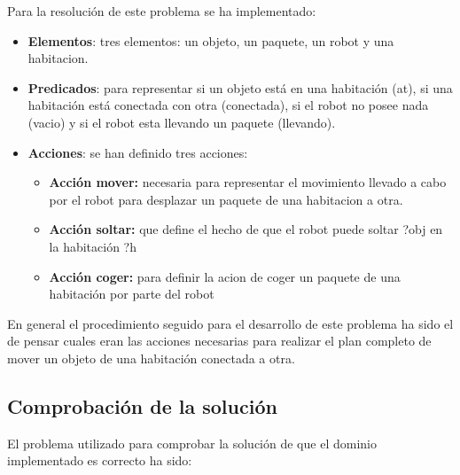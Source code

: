 Para la resolución de este problema se ha implementado:
\begin{itemize}

	\item \textbf{Elementos}: tres elementos: un objeto, un paquete, un robot y una habitacion.

	\item \textbf{Predicados}: para representar si un objeto está en una habitación (at), si una habitación está conectada con otra (conectada), si el robot no posee nada (vacio) y si el robot esta llevando un paquete (llevando).
	
	\item \textbf{Acciones}: se han definido tres acciones:
	

	\begin{itemize}
	
		\item \textbf{Acción mover:} necesaria para representar el movimiento llevado a cabo por el robot para desplazar un paquete de una habitacion a otra.
		
		\item \textbf{Acción soltar:} que define el hecho de que el robot puede soltar ?obj en la habitación ?h
		
		\item \textbf{Acción coger:} para definir la acion de coger un paquete de una habitación por parte del robot
	
	\end{itemize}	

	
\end{itemize}


	En general el procedimiento seguido para el desarrollo de este problema ha sido el de pensar cuales eran las acciones necesarias para realizar el plan completo de mover un objeto de una habitación conectada a otra. \\
	\newpage
\subsection{Comprobación de la solución}

El problema utilizado para comprobar la solución de que el dominio implementado es correcto ha sido:

